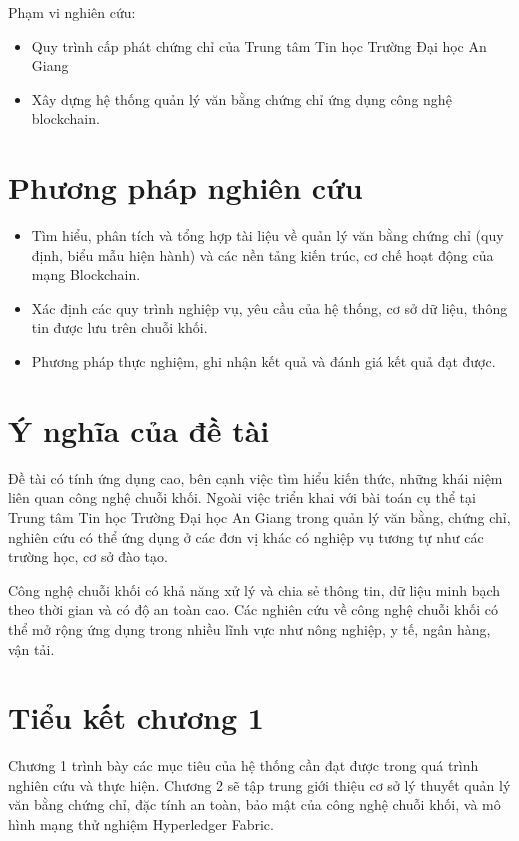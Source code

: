 Phạm vi nghiên cứu:

\begin{itemize}
\item Quy trình cấp phát chứng chỉ của Trung tâm Tin học Trường Đại học An Giang
\item Xây dựng hệ thống quản lý văn bằng chứng chỉ ứng dụng công nghệ blockchain.
\end{itemize}

\section{Phương pháp nghiên cứu}

\begin{itemize}
\item Tìm hiểu, phân tích và tổng hợp tài liệu về quản lý văn bằng chứng chỉ (quy định, biểu mẫu hiện hành) và các nền tảng kiến trúc, cơ chế hoạt động của mạng Blockchain.
\item Xác định các quy trình nghiệp vụ, yêu cầu của hệ thống, cơ sở dữ liệu, thông tin được lưu trên chuỗi khối.
\item Phương pháp thực nghiệm, ghi nhận kết quả và đánh giá kết quả đạt được.
\end{itemize}
\section{Ý nghĩa của đề tài}

Đề tài có tính ứng dụng cao, bên cạnh việc tìm hiểu kiến thức, những khái niệm liên quan công nghệ chuỗi khối.
Ngoài việc triển khai với bài toán cụ thể tại Trung tâm Tin học Trường Đại học An Giang trong quản lý văn bằng, chứng chỉ, nghiên cứu có thể ứng dụng ở các đơn vị khác có nghiệp vụ tương tự như các trường học, cơ sở đào tạo.

Công nghệ chuỗi khối có khả năng xử lý và chia sẻ thông tin, dữ liệu minh bạch theo thời gian và có độ an toàn cao. Các nghiên cứu về công nghệ chuỗi khối có thể mở rộng ứng dụng trong nhiều lĩnh vực như nông nghiệp, y tế, ngân hàng, vận tải.
\section{Tiểu kết chương 1}

Chương 1 trình bày các mục tiêu của hệ thống cần đạt được trong quá trình nghiên cứu và thực hiện. Chương 2 sẽ tập trung giới thiệu cơ sở lý thuyết quản lý văn bằng chứng chỉ, đặc tính an toàn, bảo mật của công nghệ chuỗi khối, và mô hình mạng thử nghiệm Hyperledger Fabric.